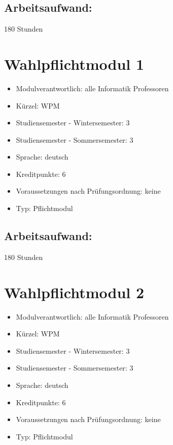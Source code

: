 \section*{Arbeitsaufwand:}\label{arbeitsaufwand-5}

180 Stunden

\chapter{Wahlpflichtmodul 1}\label{wahlpflichtmodul-1}

\begin{itemize}
\tightlist
\item
  Modulverantwortlich: alle Informatik Professoren
\item
  Kürzel: WPM
\item
  Studiensemester - Wintersemester: 3
\item
  Studiensemester - Sommersemester: 3
\item
  Sprache: deutsch
\item
  Kreditpunkte: 6
\item
  Voraussetzungen nach Prüfungsordnung: keine
\item
  Typ: Pflichtmodul
\end{itemize}

\section*{Arbeitsaufwand:}\label{arbeitsaufwand-6}

180 Stunden

\chapter{Wahlpflichtmodul 2}\label{wahlpflichtmodul-2}

\begin{itemize}
\tightlist
\item
  Modulverantwortlich: alle Informatik Professoren
\item
  Kürzel: WPM
\item
  Studiensemester - Wintersemester: 3
\item
  Studiensemester - Sommersemester: 3
\item
  Sprache: deutsch
\item
  Kreditpunkte: 6
\item
  Voraussetzungen nach Prüfungsordnung: keine
\item
  Typ: Pflichtmodul
\end{itemize}


